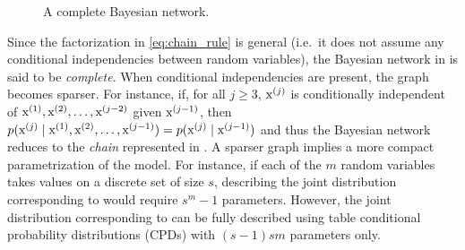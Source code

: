 \begin{figure}
    \centering
    \caption{A complete Bayesian network.}
    \label{fig:complete_bayesian_net}
\end{figure}

Since the factorization in \eqref{eq:chain_rule} is general (i.e.\ it does not assume any conditional independencies between random variables), the Bayesian network in  is said to be \emph{complete}. When conditional independencies are present, the graph becomes sparser. For instance, if, for all $j \geq 3$, ${\textnormal{x}}^{(j)}$ is conditionally independent of ${\textnormal{x}}^{(1)}, {\textnormal{x}}^{(2)}, \dots, {\textnormal{x}}^{(j-2)}$ given ${\textnormal{x}}^{(j-1)}$, then $p({\textnormal{x}}^{(j)} \mid {\textnormal{x}}^{(1)}, {\textnormal{x}}^{(2)}, \dots, {\textnormal{x}}^{(j-1)}) = p({\textnormal{x}}^{(j)} \mid {\textnormal{x}}^{(j-1)})$ and thus the Bayesian network reduces to the \emph{chain} represented in . A sparser graph implies a more compact parametrization of the model. For instance, if each of the $m$ random variables takes values on a discrete set of size $s$, describing the joint distribution corresponding to  would require $s^{m}-1$ parameters. However, the joint distribution corresponding to  can be fully described using table conditional probability distributions (CPDs) with $(s-1)sm$ parameters only.

